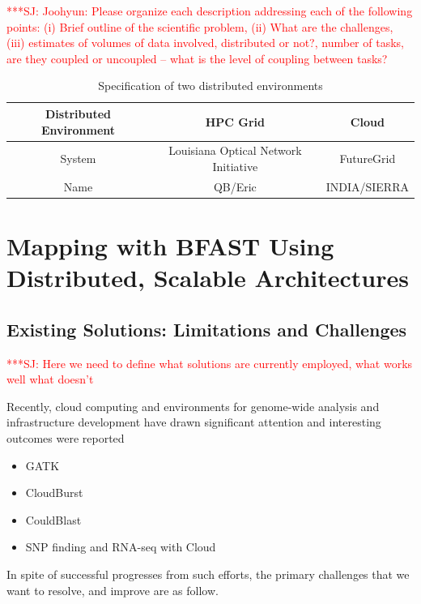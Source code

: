 \documentclass[12pt]{article}
\newcommand{\jhanote}[1]{ {\textcolor{red}     {***SJ: #1}}}
\newcommand{\jhanote}[1]{}
\begin{document}
\jhanote{Joohyun: Please organize each description addressing each of
  the following points: (i) Brief outline of the scientific problem,
  (ii) What are the challenges, (iii) estimates of volumes of data
  involved, distributed or not?, number of tasks, are they coupled or
  uncoupled -- what is the level of coupling between tasks?}


 \begin{table}
 \begin{tabular}{|c|cc|} 
 \hline 
Distributed Environment &  HPC Grid &  Cloud \\ \hline
System  &  Louisiana Optical Network Initiative & FutureGrid \\
Name &  QB/Eric   &  INDIA/SIERRA \\
 \hline
 \end{tabular}
\caption{Specification of two distributed environments}
\label{table:two-systems} 
\end{table}
 




\section{Mapping with BFAST Using Distributed, Scalable Architectures}

\subsection{Existing Solutions: Limitations and Challenges}

\jhanote{Here we need to define what solutions are currently employed, what works well
  what doesn't}

Recently, cloud computing and environments for genome-wide analysis and infrastructure development have drawn significant attention and interesting outcomes were reported\cite{taylor2010,cloudburst, cloudblast, langmead2009, langmead2010,gatk, halligan2009}

\begin{itemize}
\item GATK\cite{gatk}
\item CloudBurst\cite{cloudburst}
\item CouldBlast\cite{cloudblast}
\item SNP finding and RNA-seq with Cloud\cite{langmead2009, langmead2010}
\end{itemize}

In spite of successful progresses from such efforts, the primary challenges that we want to resolve, and improve are as follow.
\end{document}
